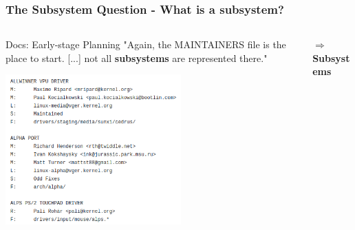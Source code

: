 \documentclass[9pt]{beamer}
\begin{document}
	\begin{frame}
	\frametitle{The Subsystem Question - What is a subsystem?}


	\begin{columns}
		\begin{column}{0.55\textwidth}
			\begin{block}{Docs: Early-stage Planning}
				"Again, the MAINTAINERS file is	the place to start. [...] not all \textbf{subsystems} are represented there."
			\end{block}
			\begin{center}
     		\includegraphics[width=0.6\textwidth]{pics/MAINTAINERSbild.png}
			\end{center}
		\end{column}
		\begin{column}{0.5\textwidth}
			\begin{center}
			$\Rightarrow$ \textbf{Subsystems}
			\end{center}
		\end{column}
	\end{columns}
	\end{frame}
\end{document}
